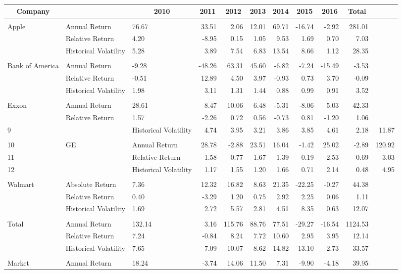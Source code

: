 \begin{table}[!tbp]
{\centering
\begin{tabular}{lllrrrrrrrr}
\hline\hline
\multicolumn{1}{c}{Company}&\multicolumn{1}{c}{ }&\multicolumn{1}{c}{2010}&\multicolumn{1}{c}{2011}&\multicolumn{1}{c}{2012}&\multicolumn{1}{c}{2013}&\multicolumn{1}{c}{2014}&\multicolumn{1}{c}{2015}&\multicolumn{1}{c}{2016}&\multicolumn{1}{c}{Total}\tabularnewline
\hline
&&&&&&&&&&\tabularnewline
Apple&Annual Return& 76.67& 33.51&  2.06&12.01&69.71&-16.74& -2.92& 281.01\tabularnewline
&Relative Return&  4.20& -8.95&  0.15& 1.05& 9.53&  1.69&  0.70&   7.03\tabularnewline
&Historical Volatility&  5.28&  3.89&  7.54& 6.83&13.54&  8.66&  1.12&  28.35\tabularnewline
\hline
&&&&&&&&&&\tabularnewline
Bank of America&Annual Return& -9.28&-48.26& 63.31&45.60&-6.82& -7.24&-15.49&  -3.53\tabularnewline
&Relative Return& -0.51& 12.89&  4.50& 3.97&-0.93&  0.73&  3.70&  -0.09\tabularnewline
&Historical Volatility&  1.98&  3.11&  1.31& 1.44& 0.88&  0.99&  0.91&   3.52\tabularnewline
\hline
&&&&&&&&&&\tabularnewline
Exxon&Annual Return& 28.61&  8.47& 10.06& 6.48&-5.31& -8.06&  5.03&  42.33\tabularnewline
&Relative Return&  1.57& -2.26&  0.72& 0.56&-0.73&  0.81& -1.20&   1.06\tabularnewline
9&&Historical Volatility&  4.74&  3.95&  3.21& 3.86& 3.85&  4.61&  2.18&  11.87\tabularnewline
\hline
&&&&&&&&&&\tabularnewline
10&GE&Annual Return& 28.78& -2.88& 23.51&16.04&-1.42& 25.02& -2.89& 120.92\tabularnewline
11&&Relative Return&  1.58&  0.77&  1.67& 1.39&-0.19& -2.53&  0.69&   3.03\tabularnewline
12&&Historical Volatility&  1.17&  1.55&  1.20& 1.66& 0.71&  2.14&  0.48&   4.95\tabularnewline
\hline
&&&&&&&&&&\tabularnewline
Walmart&Absolute Return&  7.36& 12.32& 16.82& 8.63&21.35&-22.25& -0.27&  44.38\tabularnewline
&Relative Return&  0.40& -3.29&  1.20& 0.75& 2.92&  2.25&  0.06&   1.11\tabularnewline
&Historical Volatility&  1.69&  2.72&  5.57& 2.81& 4.51&  8.35&  0.63&  12.07\tabularnewline
\hline
&&&&&&&&&&\tabularnewline
Total&Annual Return&132.14&  3.16&115.76&88.76&77.51&-29.27&-16.54&1124.53\tabularnewline
&Relative Return&  7.24& -0.84&  8.24& 7.72&10.60&  2.95&  3.95&  12.14\tabularnewline
&Historical Volatility&  7.65&  7.09& 10.07& 8.62&14.82& 13.10&  2.73&  33.57\tabularnewline
\hline
&&&&&&&&&&\tabularnewline
Market&Annual Return& 18.24& -3.74& 14.06&11.50& 7.31& -9.90& -4.18&  39.95\tabularnewline
\hline
\end{tabular}}

\end{table}